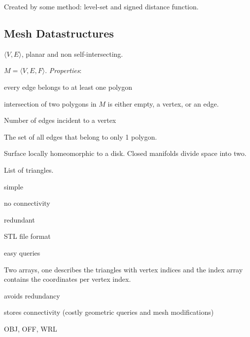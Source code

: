 \begin{definition}
  Created by some method: level-set and signed distance function.
\end{definition}

\subsection{Mesh Datastructures}

\begin{definition}[Polygon]
  \(\langle V, E\rangle\), planar and non self-intersecting.
\end{definition}

\begin{definition}
  \(M = \langle V, E, F\rangle\).
  \textit{Properties}:
  \begin{itemize*}
    \item every edge belongs to at least one polygon
    \item intersection of two polygons in \(M\) is either empty, a vertex, or an edge.
  \end{itemize*}
\end{definition}

\begin{definition}[Valence]
  Number of edges incident to a vertex
\end{definition}

\begin{definition}[Boundary]
  The set of all edges that belong to only 1 polygon.
\end{definition}

\begin{definition}[Manifold]
  Surface locally homeomorphic to a disk. Closed manifolds divide space into two.
\end{definition}

\begin{definition}
  List of triangles.
  \begin{itemize*}
    \item simple
    \item no connectivity
    \item redundant
    \item STL file format
    \item easy queries
  \end{itemize*}
\end{definition}

\begin{definition}
  Two arrays, one describes the triangles with vertex indices and the index array contains the coordinates per vertex index.
  \begin{itemize*}
    \item avoids redundancy
    \item stores connectivity (costly geometric queries and mesh modifications)
    \item OBJ, OFF, WRL
  \end{itemize*}
\end{definition}

